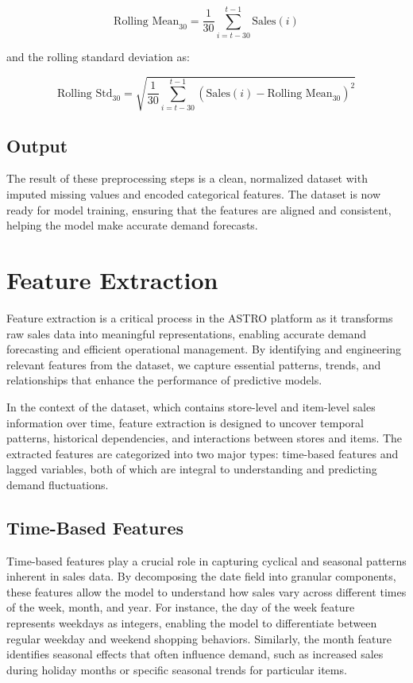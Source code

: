 \[
    \text{Rolling Mean}_{30} = \frac{1}{30} \sum_{i=t-30}^{t-1} \text{Sales}(i)
\]

and the rolling standard deviation as:

\[
    \text{Rolling Std}_{30} = \sqrt{\frac{1}{30} \sum_{i=t-30}^{t-1} (\text{Sales}(i) - \text{Rolling Mean}_{30})^2}
\]


\subsection*{Output}

The result of these preprocessing steps is a clean, normalized dataset with imputed missing values and encoded categorical features. The dataset is now ready for model training, ensuring that the features are aligned and consistent, helping the model make accurate demand forecasts.

\section{Feature Extraction}

Feature extraction is a critical process in the ASTRO platform as it transforms raw sales data into meaningful representations, enabling accurate demand forecasting and efficient operational management. By identifying and engineering relevant features from the dataset, we capture essential patterns, trends, and relationships that enhance the performance of predictive models.

In the context of the dataset, which contains store-level and item-level sales information over time, feature extraction is designed to uncover temporal patterns, historical dependencies, and interactions between stores and items. The extracted features are categorized into two major types: time-based features and lagged variables, both of which are integral to understanding and predicting demand fluctuations.

\subsection{Time-Based Features}

Time-based features play a crucial role in capturing cyclical and seasonal patterns inherent in sales data. By decomposing the date field into granular components, these features allow the model to understand how sales vary across different times of the week, month, and year. For instance, the day of the week feature represents weekdays as integers, enabling the model to differentiate between regular weekday and weekend shopping behaviors. Similarly, the month feature identifies seasonal effects that often influence demand, such as increased sales during holiday months or specific seasonal trends for particular items.


